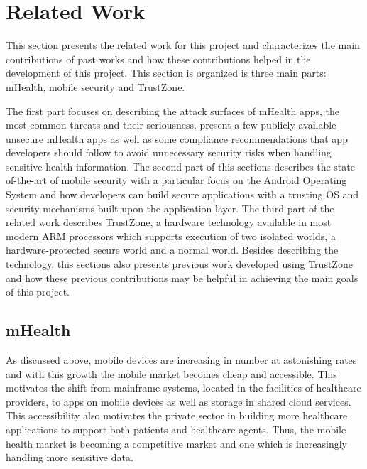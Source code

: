 
% 
% 
\section{Related Work}


This section presents the related work for this project and characterizes the main contributions of past works and how these contributions helped in the development of this project. This section is organized is three main parts: mHealth, mobile security and TrustZone.

The first part focuses on describing the attack surfaces of mHealth apps, the most common threats and their seriousness, present a few publicly available unsecure mHealth apps as well as some compliance recommendations that app developers should follow to avoid unnecessary security risks when handling sensitive health information. The second part of this sections describes the state-of-the-art of mobile security with a particular focus on the Android Operating System and how developers can build secure applications with a trusting \ac{OS} and security mechanisms built upon the application layer. The third part of the related work describes TrustZone, a hardware technology available in most modern \ac{ARM} processors which supports execution of two isolated worlds, a hardware-protected secure world and a normal world. Besides describing the technology, this sections also presents previous work developed using TrustZone and how these previous contributions may be helpful in achieving the main goals of this project. 

\subsection{mHealth}
\label{sec:mhealth}

As discussed above, mobile devices are increasing in number at astonishing rates and with this growth the mobile market becomes cheap and accessible. This motivates the shift from mainframe systems, located in the facilities of healthcare providers, to apps on mobile devices as well as storage in shared cloud services. This accessibility also motivates the private sector in building more healthcare applications to support both patients and healthcare agents. Thus, the mobile health market is becoming a competitive market and one which is increasingly handling more sensitive data.

